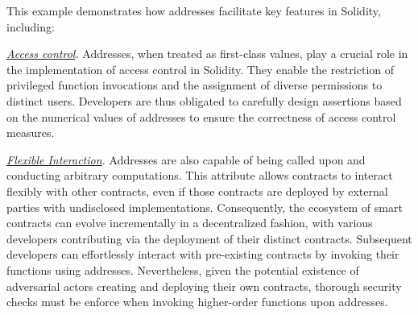 This example demonstrates how addresses facilitate key features in Solidity, including:
  
\noindent
\textit{\underline{Access control}.}
Addresses, when treated as first-class values, play a crucial role in the implementation of access control in Solidity.
They enable the restriction of privileged function invocations and the assignment of diverse permissions to distinct users.
Developers are thus obligated to carefully design assertions based on the numerical values of addresses to ensure the correctness of access control measures.



\noindent
\textit{\underline{Flexible Interaction}.}
Addresses are also capable of being called upon and conducting arbitrary computations.
This attribute allows contracts to interact flexibly with other contracts, even if those contracts are deployed by external parties with undisclosed implementations.
Consequently, the ecosystem of smart contracts can evolve incrementally in a decentralized fashion, with various developers contributing via the deployment of their distinct contracts.
Subsequent developers can effortlessly interact with pre-existing contracts by invoking their functions using addresses.
Nevertheless, given the potential existence of adversarial actors creating and deploying their own contracts, thorough security checks must be enforce when invoking higher-order functions upon addresses.









